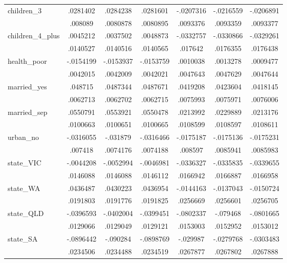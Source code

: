 {\begin{tabular}{l*{6}{c}}
children\_3  &    .0281402&    .0284238&    .0281601&   -.0207316&   -.0216559&   -.0206891\\
            &     .008089&    .0080878&    .0080895&    .0093376&    .0093359&    .0093377\\
children\_4\_plus&    .0045212&    .0037502&    .0048873&   -.0332757&   -.0330866&   -.0329261\\
            &    .0140527&    .0140516&    .0140565&     .017642&    .0176355&    .0176438\\
health\_poor &   -.0154199&   -.0153937&   -.0153759&    .0010038&    .0013278&    .0009477\\
            &    .0042015&    .0042009&    .0042021&    .0047643&    .0047629&    .0047644\\
married\_yes &     .048715&    .0487344&    .0487671&    .0419208&    .0423604&    .0418145\\
            &    .0062713&    .0062702&    .0062715&    .0075993&    .0075971&    .0076006\\
married\_sep &    .0550791&    .0553921&    .0550478&    .0213992&    .0229889&    .0213176\\
            &    .0100663&    .0100651&    .0100665&    .0108599&    .0108597&    .0108611\\
urban\_no    &   -.0316055&    -.031879&   -.0316466&   -.0175187&   -.0175136&   -.0175231\\
            &     .007418&    .0074176&    .0074188&     .008597&    .0085941&    .0085983\\
state\_VIC   &   -.0044208&   -.0052994&   -.0046981&   -.0336327&   -.0335835&   -.0339655\\
            &    .0146088&    .0146088&    .0146112&    .0166942&    .0166887&    .0166958\\
state\_WA    &    .0436487&    .0430223&    .0436954&   -.0144163&   -.0137043&   -.0150724\\
            &    .0191803&    .0191776&    .0191825&    .0256669&    .0256601&    .0256705\\
state\_QLD   &   -.0396593&   -.0402004&   -.0399451&   -.0802337&    -.079468&   -.0801665\\
            &    .0129066&    .0129049&    .0129121&    .0153003&    .0152952&    .0153012\\
state\_SA    &   -.0896442&    -.090284&   -.0898769&    -.029987&   -.0279768&   -.0303483\\
            &    .0234506&    .0234488&    .0234519&    .0267877&    .0267802&    .0267888\\

\end{tabular}}
